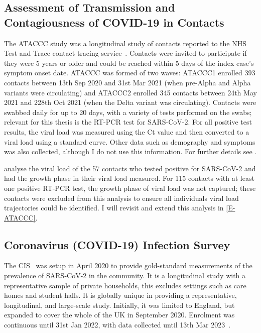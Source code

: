 \documentclass[thesis.tex]{subfiles}
\begin{document}
\subsection{Assessment of Transmission and Contagiousness of COVID-19 in Contacts}

The ATACCC study was a longitudinal study of contacts reported to the NHS Test and Trace contact tracing service~\autocite{hakkiOnset}.
Contacts were invited to participate if they were 5 years or older and  could be reached within 5 days of the index case's symptom onset date.
ATACCC was formed of two waves: ATACCC1 enrolled 393 contacts between 13th Sep 2020 and 31st Mar 2021 (when pre-Alpha and Alpha variants were circulating) and ATACCC2 enrolled 345 contacts between 24th May 2021 and 228th Oct 2021 (when the Delta variant was circulating).
Contacts were swabbed daily for up to 20 days, with a variety of tests performed on the swabs; relevant for this thesis is the RT-PCR test for SARS-CoV-2.
For all positive test results, the viral load was measured using the Ct value and then converted to a viral load using a standard curve.
Other data such as demography and symptoms was also collected, although I do not use this information.
For further details see \textcite{singanayagamDuration,hakkiOnset}.

\Textcite{hakkiOnset} analyse the viral load of the 57 contacts who tested positive for SARS-CoV-2 and had the growth phase in their viral load measured.
For 115 contacts with at least one positive RT-PCR test, the growth phase of viral load was not captured; these contacts were excluded from this analysis to ensure all individuals viral load trajectories could be identified.
I will revisit and extend this analysis in \cref{E-ATACCC}.

\subsection{Coronavirus (COVID-19) Infection Survey} \label{intro:sec:cis}

The CIS~\autocite{CIS} was setup in April 2020 to provide gold-standard measurements of the prevalence of SARS-CoV-2 in the community.
It is a longitudinal study with a representative sample of private households, this excludes settings such as care homes and student halls.
It is globally unique in providing a representative, longitudinal, and large-scale study.
Initially, it was limited to England, but expanded to cover the whole of the UK in September 2020.
Enrolment was continuous until 31st Jan 2022, with data collected until 13th Mar 2023~\autocite{weiRisk}. 
\end{document}
